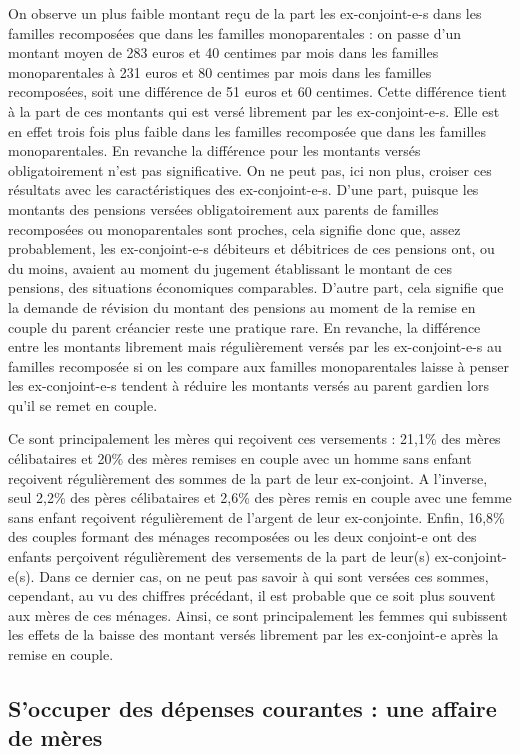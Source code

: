 \documentclass[
  12pt,
]{book}
\begin{document}
On observe un plus faible montant reçu de la part les ex-conjoint-e-s
dans les familles recomposées que dans les familles monoparentales : on
passe d'un montant moyen de 283 euros et 40 centimes par mois dans les
familles monoparentales à 231 euros et 80 centimes par mois dans les
familles recomposées, soit une différence de 51 euros et 60 centimes.
Cette différence tient à la part de ces montants qui est versé librement
par les ex-conjoint-e-s. Elle est en effet trois fois plus faible dans
les familles recomposée que dans les familles monoparentales. En
revanche la différence pour les montants versés obligatoirement n'est
pas significative. On ne peut pas, ici non plus, croiser ces résultats
avec les caractéristiques des ex-conjoint-e-s. D'une part, puisque les
montants des pensions versées obligatoirement aux parents de familles
recomposées ou monoparentales sont proches, cela signifie donc que,
assez probablement, les ex-conjoint-e-s débiteurs et débitrices de ces
pensions ont, ou du moins, avaient au moment du jugement établissant le
montant de ces pensions, des situations économiques comparables. D'autre
part, cela signifie que la demande de révision du montant des pensions
au moment de la remise en couple du parent créancier reste une pratique
rare. En revanche, la différence entre les montants librement mais
régulièrement versés par les ex-conjoint-e-s au familles recomposée si
on les compare aux familles monoparentales laisse à penser les
ex-conjoint-e-s tendent à réduire les montants versés au parent gardien
lors qu'il se remet en couple.

Ce sont principalement les mères qui reçoivent ces versements : 21,1\%
des mères célibataires et 20\% des mères remises en couple avec un homme
sans enfant reçoivent régulièrement des sommes de la part de leur
ex-conjoint. A l'inverse, seul 2,2\% des pères célibataires et 2,6\% des
pères remis en couple avec une femme sans enfant reçoivent régulièrement
de l'argent de leur ex-conjointe. Enfin, 16,8\% des couples formant des
ménages recomposées ou les deux conjoint-e ont des enfants perçoivent
régulièrement des versements de la part de leur(s) ex-conjoint-e(s).
Dans ce dernier cas, on ne peut pas savoir à qui sont versées ces
sommes, cependant, au vu des chiffres précédant, il est probable que ce
soit plus souvent aux mères de ces ménages. Ainsi, ce sont
principalement les femmes qui subissent les effets de la baisse des
montant versés librement par les ex-conjoint-e après la remise en
couple.

\subsection{S'occuper des dépenses courantes : une affaire de
mères}\label{soccuper-des-duxe9penses-courantes-une-affaire-de-muxe8res}
\end{document}
